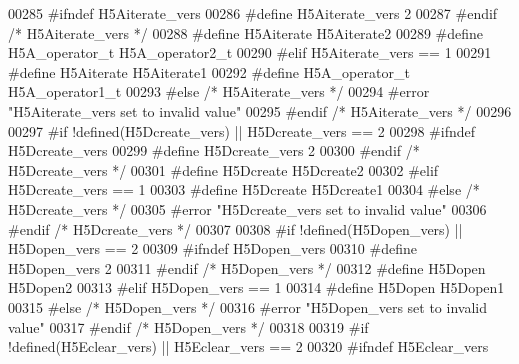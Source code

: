 \begin{DoxyCode}
00285 \textcolor{preprocessor}{  #ifndef H5Aiterate\_vers}
00286 \textcolor{preprocessor}{    #define H5Aiterate\_vers 2}
00287 \textcolor{preprocessor}{  #endif }\textcolor{comment}{/* H5Aiterate\_vers */}\textcolor{preprocessor}{}
00288 \textcolor{preprocessor}{  #define H5Aiterate H5Aiterate2}
00289 \textcolor{preprocessor}{  #define H5A\_operator\_t H5A\_operator2\_t}
00290 \textcolor{preprocessor}{#elif H5Aiterate\_vers == 1}
00291 \textcolor{preprocessor}{  #define H5Aiterate H5Aiterate1}
00292 \textcolor{preprocessor}{  #define H5A\_operator\_t H5A\_operator1\_t}
00293 \textcolor{preprocessor}{#else }\textcolor{comment}{/* H5Aiterate\_vers */}\textcolor{preprocessor}{}
00294 \textcolor{preprocessor}{  #error "H5Aiterate\_vers set to invalid value"}
00295 \textcolor{preprocessor}{#endif }\textcolor{comment}{/* H5Aiterate\_vers */}\textcolor{preprocessor}{}
00296 
00297 \textcolor{preprocessor}{#if !defined(H5Dcreate\_vers) || H5Dcreate\_vers == 2}
00298 \textcolor{preprocessor}{  #ifndef H5Dcreate\_vers}
00299 \textcolor{preprocessor}{    #define H5Dcreate\_vers 2}
00300 \textcolor{preprocessor}{  #endif }\textcolor{comment}{/* H5Dcreate\_vers */}\textcolor{preprocessor}{}
00301 \textcolor{preprocessor}{  #define H5Dcreate H5Dcreate2}
00302 \textcolor{preprocessor}{#elif H5Dcreate\_vers == 1}
00303 \textcolor{preprocessor}{  #define H5Dcreate H5Dcreate1}
00304 \textcolor{preprocessor}{#else }\textcolor{comment}{/* H5Dcreate\_vers */}\textcolor{preprocessor}{}
00305 \textcolor{preprocessor}{  #error "H5Dcreate\_vers set to invalid value"}
00306 \textcolor{preprocessor}{#endif }\textcolor{comment}{/* H5Dcreate\_vers */}\textcolor{preprocessor}{}
00307 
00308 \textcolor{preprocessor}{#if !defined(H5Dopen\_vers) || H5Dopen\_vers == 2}
00309 \textcolor{preprocessor}{  #ifndef H5Dopen\_vers}
00310 \textcolor{preprocessor}{    #define H5Dopen\_vers 2}
00311 \textcolor{preprocessor}{  #endif }\textcolor{comment}{/* H5Dopen\_vers */}\textcolor{preprocessor}{}
00312 \textcolor{preprocessor}{  #define H5Dopen H5Dopen2}
00313 \textcolor{preprocessor}{#elif H5Dopen\_vers == 1}
00314 \textcolor{preprocessor}{  #define H5Dopen H5Dopen1}
00315 \textcolor{preprocessor}{#else }\textcolor{comment}{/* H5Dopen\_vers */}\textcolor{preprocessor}{}
00316 \textcolor{preprocessor}{  #error "H5Dopen\_vers set to invalid value"}
00317 \textcolor{preprocessor}{#endif }\textcolor{comment}{/* H5Dopen\_vers */}\textcolor{preprocessor}{}
00318 
00319 \textcolor{preprocessor}{#if !defined(H5Eclear\_vers) || H5Eclear\_vers == 2}
00320 \textcolor{preprocessor}{  #ifndef H5Eclear\_vers}

\end{DoxyCode}
